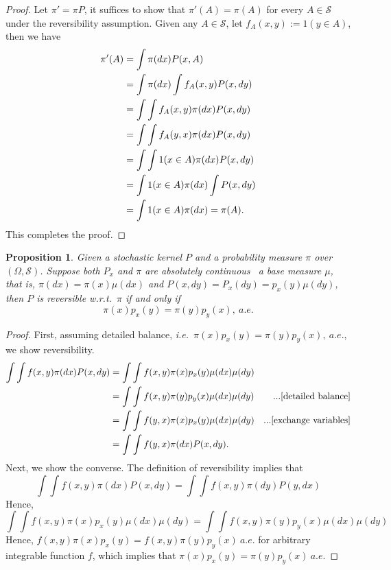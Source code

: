 \documentclass[a4paper,11pt]{article}
\newtheorem{proposition}{Proposition}
\newcommand{\sset}{\mathcal{S}}
\begin{document}
\begin{proof}
    Let $\pi' = \pi P$, it suffices to show that $\pi'(A) = \pi(A)$ for every $A \in \sset$ under the reversibility assumption.
    Given any $A \in \sset$, let $f_A(x, y) := 1(y \in A)$, then we have
    \begin{align}
        \pi'(A) 
        &= \int \pi(dx) P(x, A) \notag \\
        &= \int \pi(dx) \int f_A(x, y) P(x, dy) \notag \\
        &= \int \int f_A(x, y) \pi(dx) P(x, dy) \notag \\
        &= \int \int f_A(y, x) \pi(dx) P(x, dy) \notag \\
        &= \int \int 1(x \in A) \pi(dx) P(x, dy) \notag \\
        &= \int 1(x \in A) \pi(dx) \int P(x, dy) \notag \\
        &= \int 1(x \in A) \pi(dx) = \pi(A).
    \end{align}
    This completes the proof.
\end{proof}

\begin{proposition}
    Given a stochastic kernel $P$ and a probability measure $\pi$ over $(\Omega, \sset)$. Suppose both $P_x$ and $\pi$ are absolutely continuous ~a base measure $\mu$, that is,
    $\pi(dx) = \pi(x) \mu(dx)$ and $P(x, dy) = P_x(dy) = p_x(y) \mu(dy)$, then $P$ is reversible \textit{w.r.t.}~$\pi$ if and only if 
    \begin{equation}
        \pi(x) p_x(y) = \pi(y) p_y(x), \ a.e.
    \end{equation}
\end{proposition}

\begin{proof}
    First, assuming detailed balance, \textit{i.e.}~$\pi(x) p_x(y) = \pi(y) p_y(x), \ a.e.$, we show reversibility.
    \begin{align}
        \int \int f(x, y) \pi(dx) P(x, dy) 
        &= \int \int f(x, y) \pi(x) p_x(y) \mu(dx) \mu(dy) \notag \\
        &= \int \int f(x, y) \pi(y) p_y(x) \mu(dx) \mu(dy) & ...[\text{detailed balance}] \notag \\
        &= \int \int f(y, x) \pi(x) p_x(y) \mu(dx) \mu(dy) & ...[\text{exchange variables}] \notag \\
        &= \int \int f(y, x) \pi(dx) P(x, dy).
    \end{align}
    Next, we show the converse.
    The definition of reversibility implies that 
    \begin{equation}
        \int \int f(x, y) \pi(dx) P(x, dy) = \int \int f(x, y) \pi(dy) P(y, dx)
    \end{equation}
    Hence, 
    \begin{equation}
        \int \int f(x, y) \pi(x) p_x(y) \mu(dx) \mu(dy) = \int \int f(x, y) \pi(y) p_y(x) \mu(dx) \mu(dy)
    \end{equation}
    Hence, $f(x, y) \pi(x) p_x(y) = f(x, y) \pi(y) p_y(x) \ a.e.$ for arbitrary integrable function $f$, which implies that 
    $\pi(x) p_x(y) = \pi(y) p_y(x) \ a.e$. 
\end{proof}
\end{document}
